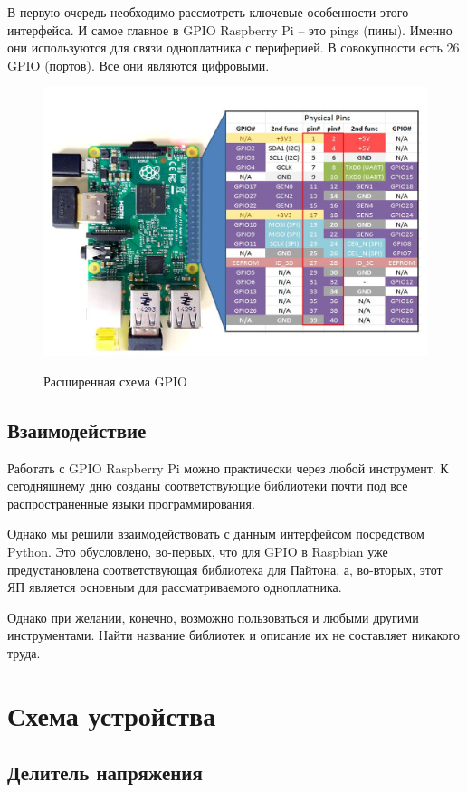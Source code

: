 \documentclass[a4paper, 14pt]{article}
\begin{document}
В первую очередь необходимо рассмотреть ключевые особенности этого интерфейса. И самое главное в GPIO Raspberry Pi – это pings (пины). Именно они используются для связи одноплатника с периферией.
В совокупности есть 26 GPIO (портов). Все они являются цифровыми.

\begin{figure}[H]
	\centering
	\includegraphics[width=12cm]{screenshots/999.png}\\
	\caption{Расширенная схема GPIO}
\end{figure}

\subsection{Взаимодействие}

Работать с GPIO Raspberry Pi можно практически через любой инструмент. К сегодняшнему дню созданы соответствующие библиотеки почти под все распространенные языки программирования.

Однако мы решили взаимодействовать с данным интерфейсом посредством Python. Это обусловлено, во-первых, что для GPIO в Raspbian уже предустановлена соответствующая библиотека для Пайтона, а, во-вторых, этот ЯП является основным для рассматриваемого одноплатника.

Однако при желании, конечно, возможно пользоваться и любыми другими инструментами. Найти название библиотек и описание их не составляет никакого труда.

\newpage
\section{Схема устройства}

\subsection{Делитель напряжения}
\end{document}
